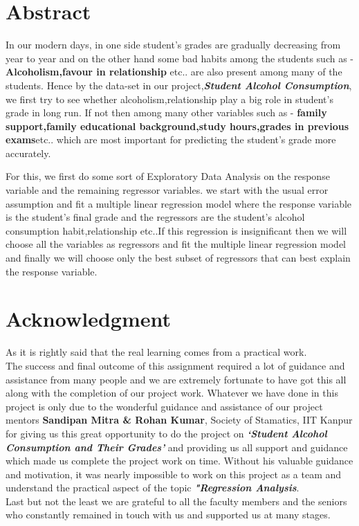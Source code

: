 \documentclass[A4paper,11pt]{report}
\begin{document}
	\section*{Abstract}
	In our modern days, in one side student's grades are gradually decreasing from year to year and on the other hand some bad habits among the students such as -\textbf{Alcoholism,favour in relationship }etc.. are also present among many of the students. Hence by the data-set in our project,\textbf{\textit{Student Alcohol Consumption}}, we first try to see whether alcoholism,relationship play a big role in student's grade in long run. If not then among many other variables such as - \textbf{family support,family educational background,study hours,grades in previous exams}etc.. which are most important for predicting the student's grade more accurately.\\
	\par For this, we first do some sort of Exploratory Data Analysis on the response variable and the remaining regressor variables.  we start with the usual error assumption and fit a multiple linear regression model where the response variable is the student's final grade and the regressors are the student's alcohol consumption habit,relationship etc..If this regression is insignificant then we will choose all the variables as regressors and fit the multiple linear regression model and finally we will choose only the best subset of regressors that can best explain the response variable.
	\newpage
	\section*{Acknowledgment}
	As it is rightly said that the real learning comes from a practical work.\\
	
	The success and final outcome of this assignment required a lot of guidance and assistance from many people and we are extremely fortunate to have got this all along with the completion of our project work. Whatever we have done in this project is only due to the wonderful guidance and assistance of our project mentors \textbf{Sandipan Mitra \& Rohan Kumar}, Society of Stamatics, IIT Kanpur for giving us this great opportunity to do the project on \textbf{\textit{‘Student Alcohol Consumption and Their Grades’}} and providing us all support and guidance which made us complete the project work on time. Without his valuable guidance and motivation, it was nearly impossible to work on this project as a team and understand the practical aspect of the topic \textbf{\textit {"Regression Analysis}}. 
	\\Last but not the least we are grateful to all the faculty members and the seniors who constantly remained in touch with us and supported us at many stages.\\
	
\end{document}
